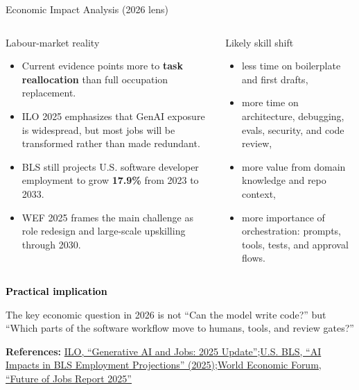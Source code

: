\documentclass[aspectratio=43,9pt]{beamer}
\newcommand{\srclink}[2]{\href{#2}{\textcolor{black!68}{#1}}}
\newcommand{\sep}{;\hspace{0.35em}}
\newcommand{\refline}[2][References]{%
  \vfill
  {\raggedright\fontsize{5.1}{5.5}\selectfont\color{black!68}\textbf{#1:} #2\par}%
}
\newcommand{\srcILO}{\srclink{ILO, ``Generative AI and Jobs: 2025 Update''}{https://www.ilo.org/publications/generative-ai-and-jobs-2025-update}}
\newcommand{\srcBLS}{\srclink{U.S. BLS, ``AI Impacts in BLS Employment Projections'' (2025)}{https://www.bls.gov/opub/ted/2025/ai-impacts-in-bls-employment-projections.htm}}
\newcommand{\srcWEF}{\srclink{World Economic Forum, ``Future of Jobs Report 2025''}{https://www.weforum.org/publications/the-future-of-jobs-report-2025/digest/}}
\begin{document}
\begin{frame}{Economic Impact Analysis (2026 lens)}
\scriptsize
\begin{columns}[T,totalwidth=\textwidth]
\begin{block}{Labour-market reality}
\begin{itemize}
  \item Current evidence points more to \textbf{task reallocation} than full occupation replacement.
  \item ILO 2025 emphasizes that GenAI exposure is widespread, but most jobs will be transformed rather than made redundant.
  \item BLS still projects U.S. software developer employment to grow \textbf{17.9\%} from 2023 to 2033.
  \item WEF 2025 frames the main challenge as role redesign and large-scale upskilling through 2030.
\end{itemize}
\end{block}

\begin{block}{Likely skill shift}
\begin{itemize}
  \item less time on boilerplate and first drafts,
  \item more time on architecture, debugging, evals, security, and code review,
  \item more value from domain knowledge and repo context,
  \item more importance of orchestration: prompts, tools, tests, and approval flows.
\end{itemize}
\end{block}
\end{columns}

{\large\textcolor{black}{\textbf{Practical implication}}\par}
\vspace{0.25em}
The key economic question in 2026 is not ``Can the model write code?'' but ``Which parts of the software workflow move to humans, tools, and review gates?''

\refline{\srcILO\sep \srcBLS\sep \srcWEF}
\end{frame}
\end{document}
